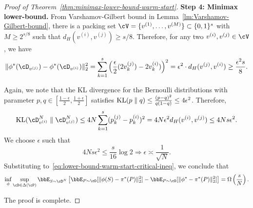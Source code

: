 \begin{proof}[Proof of Theorem~\ref{thm:minimax-lower-bound-warm-start}]
     \textbf{Step 4: Minimax lower-bound.} From Varshamov-Gilbert bound in Lemma~\ref{lm:Varshamov-Gilbert-bound}, there is a packing set $\cV = \{v^{(1)}, \dots, v^{(M)}\} \subset \{0, 1\}^s$ with $M \geq 2^{s / 8}$ such that $d_H(v^{(i)}, v^{(j)}) \geq s / 8$. Therefore, for any two $v^{(i)}, v^{(j)} \in \cV$, we have 
     \begin{equation} \label{eq:lower-bound-warm-start-critical-ineq}
         \|\phi^*(\cD_{v^{(j)}}) - \phi^*(\cD_{v^{(i)}})\|_2^2 = \sum_{k = 1}^s\left(\frac{\epsilon}{2}(2v_k^{(j)}) - 2v_{k}^{(i)})\right)^2 = \epsilon^2 \cdot d_H(v^{(j)}, v^{(i)}) \geq \frac{\epsilon^2 s}{8}.
     \end{equation}

     Again, we note that the KL divergence for the Bernoulli distributions with parameter $p, q \in [\frac{1 - \epsilon}{2}, \frac{1 + \epsilon}{2}]$ satisfies $\textup{KL}(p \parallel q) \leq \frac{(p - q)^2}{q(1 - q)} \leq 4 \epsilon^2$. Therefore,
     \[
        \textup{KL}(\cD_{v^{(i)}}^N \parallel\cD_{v^{(j)}}^N) \leq 4N\sum_{k = 1}^s (p_k^{(j)} - p_k^{(i)})^2 = 4N\epsilon^2 d_H(v^{(i)}, v^{(j)}) \leq 4Ns\epsilon^2.
     \]
     We choose $\epsilon$ such that
     \[
        4Ns\epsilon^2 \leq \frac{s}{16}\log 2 \Rightarrow \epsilon \asymp \frac{1}{\sqrt{N}}.
     \]
     Substituting to~\eqref{eq:lower-bound-warm-start-critical-ineq}, we conclude that 
     \[
        \inf_{\phi} \sup_{\cD \in \Delta(\cP)}\bbE_{S \sim \cD^N}\left[ \bbE_{P \sim \cD}[\| \phi(S) - \pi^*(P)\|_2^2] - \bbE_{P \sim \cD}[\|\phi^* - \pi^*(P)\|_2^2] \right] = \Omega\left(\frac{s}{N}\right).
     \]

     The proof is complete.
\end{proof}



